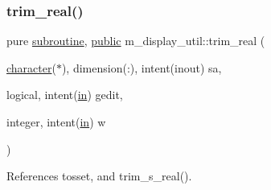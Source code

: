 \subsubsection{\texorpdfstring{trim\+\_\+real()}{trim\_real()}}
{\footnotesize\ttfamily pure \hyperlink{M__stopwatch_83_8txt_acfbcff50169d691ff02d4a123ed70482}{subroutine}, \hyperlink{M__stopwatch_83_8txt_a2f74811300c361e53b430611a7d1769f}{public} m\+\_\+display\+\_\+util\+::trim\+\_\+real (\begin{DoxyParamCaption}\item[{\hyperlink{option__stopwatch_83_8txt_abd4b21fbbd175834027b5224bfe97e66}{character}($\ast$), dimension(\+:), intent(inout)}]{sa,  }\item[{logical, intent(\hyperlink{M__journal_83_8txt_afce72651d1eed785a2132bee863b2f38}{in})}]{gedit,  }\item[{integer, intent(\hyperlink{M__journal_83_8txt_afce72651d1eed785a2132bee863b2f38}{in})}]{w }\end{DoxyParamCaption})}



References tosset, and trim\+\_\+s\+\_\+real().

